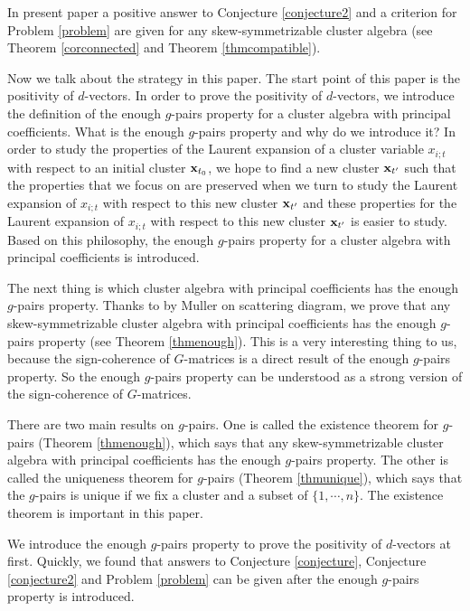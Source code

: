 \documentclass[14pt]{amsart}
\begin{document}
 In present paper a positive answer to Conjecture \ref{conjecture2} and a  criterion for Problem \ref{problem} are given  for any skew-symmetrizable cluster algebra (see Theorem \ref{corconnected} and Theorem \ref{thmcompatible}).



Now we talk about the strategy in this paper. The start point of this paper is the positivity of $d$-vectors. In order to prove the positivity of $d$-vectors, we introduce the definition of the enough $g$-pairs property for a cluster algebra with principal coefficients. What is the enough $g$-pairs property and why do we introduce it?
   In order to study the properties of the Laurent expansion of a cluster variable $x_{i;t}$ with respect to an initial cluster ${\bf x}_{t_0}$, we hope to find a new cluster ${\bf x}_{t^\prime}$ such that
    the properties that we focus on are preserved  when we turn to study the  Laurent expansion of $x_{i;t}$ with respect to this new cluster ${\bf x}_{t^\prime}$ and these properties for the  Laurent expansion of $x_{i;t}$ with respect to this new cluster ${\bf x}_{t^\prime}$ is  easier to study. Based on this philosophy, the enough $g$-pairs property for a cluster algebra with principal coefficients is introduced.

    The next thing is  which cluster algebra with principal coefficients has the enough $g$-pairs property. Thanks to \cite[Theorem 33]{M} by Muller on scattering diagram, we prove that any skew-symmetrizable cluster algebra with principal coefficients has the enough $g$-pairs property (see Theorem \ref{thmenough}). This is a very interesting  thing to us, because the sign-coherence of $G$-matrices is a direct result of the enough $g$-pairs property. So the enough $g$-pairs property can be understood as a strong version of the  sign-coherence of $G$-matrices.

    There are two main results on $g$-pairs. One is called the existence theorem for $g$-pairs (Theorem \ref{thmenough}), which says that any skew-symmetrizable cluster algebra with principal coefficients has the enough $g$-pairs property. The other is called the uniqueness theorem for $g$-pairs (Theorem \ref{thmunique}), which says that the $g$-pairs is unique if we fix a cluster and a subset of $\{1,\cdots,n\}$.  The existence theorem is important in this paper.

    We introduce the enough $g$-pairs property  to prove the positivity of $d$-vectors at first. Quickly, we found that  answers to Conjecture \ref{conjecture}, Conjecture \ref{conjecture2} and  Problem \ref{problem}   can be given  after  the enough $g$-pairs property  is introduced.
\end{document}
